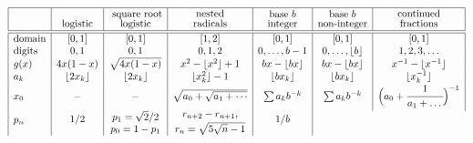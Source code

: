 \documentclass[oneside,10pt]{book}
\begin{document}
\begin{table}[H]
\[
\begin{array}{|l|c|c|c|c|c|c|}
\hline %
 & 
  \shortstack{\vspace{2ex}\quad \\ logistic } & \shortstack{\vspace{-0.5ex} square root \\ logistic} &	
  \shortstack{nested \\ radicals} 
    & \shortstack{base $b$ \\ integer} & \shortstack{base $b$ \\ non-integer} & \shortstack{continued  \\ fractions} \\
\hline
\hline
\text{domain} & [0, 1] &  [0, 1] & [1, 2] &  [0, 1] & [0, 1] &  [0, 1] \\
\text{digits} & 0, 1 &  0, 1 & 0, 1, 2 &  0,\dots,b-1 & 0,\dots,\lfloor b\rfloor &  1,2,3,\dots \\
g(x) & 4x(1-x) & \sqrt{4x(1-x)} & x^2 -\lfloor x^2\rfloor + 1 & bx - \lfloor bx \rfloor & bx - \lfloor bx  \rfloor& x^{-1}-\lfloor x^{-1}\rfloor\\
a_k & \lfloor 2x_k\rfloor & \lfloor 2x_k\rfloor & \lfloor x_k^2 \rfloor - 1 & \lfloor bx_k\rfloor & \lfloor bx_k\rfloor & \lfloor x_k^{-1}\rfloor\\
x_0 & - & - & \sqrt{a_0+\sqrt{a_1+\cdots}} & \sum a_k b^{-k} & \sum a_k b^{-k} &
\Big(a_0 + \cfrac{1}{a_1 + \dots\,}\Big)^{-1} \\[8pt]
\shortstack{$p_n$ \\ \textcolor{white}{xx}}
 &  \shortstack{$1/2$\\ \textcolor{white}{xx}} 
  &\shortstack{$p_1=\sqrt{2}/2$\\$p_0 = 1 -p_1$} 
  & \shortstack{$r_{n+2}-r_{n+1},$ \\ $r_n =\sqrt{5\sqrt{n}-1}$}
  &  \shortstack{$1/b$\\ \textcolor{white}{xx}}

\end{array}\]
\end{table}
\end{document}
